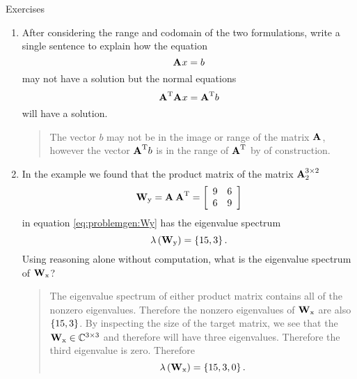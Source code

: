 \clearpage

\begin{xcb}{Exercises}
\begin{enumerate}
\item After considering the range and codomain of the two formulations, write a single sentence to explain how the equation
\begin{equation}
  \A{}x=b
\end{equation}
may not have a solution but the normal equations
\begin{equation}
  \A{T}\A{}x=\A{T}b
\end{equation}
will have a solution. 
\begin{quotation}
The vector $b$ may not be in the image or range of the matrix $\A{}$, however the vector $\A{T}b$ is in the range of $\A{T}$ by of construction.
\end{quotation}
\item In the example we found that the product matrix of the matrix $\A{\by{3}{2}}_{2}$
\begin{equation}
   \W{y}=\A{}\,\A{T} =
\mat{cc}
 {9 & 6 \\
  6 & 9} 
\end{equation}
in equation \eqref{eq:problemgen:Wy} has the eigenvalue spectrum
\begin{equation}
  \lambda\paren{\W{y}} = \lst{15,3}.
\end{equation}
Using reasoning alone without computation, what is the eigenvalue spectrum of $\W{x}$?
\begin{quotation}
  The eigenvalue spectrum of either product matrix contains all of the nonzero eigenvalues. Therefore the nonzero eigenvalues of $\W{x}$ are also $\lst{15,3}$. By inspecting the size of the target matrix, we see that the $\W{x}\in\cmplx{\bys{3}}$ and therefore will have three eigenvalues. Therefore the third eigenvalue is zero. Therefore
\begin{equation}
  \lambda\paren{\W{x}}=\lst{15,3,0}.
\end{equation}
\end{quotation}
\end{enumerate}
\end{xcb}

\endinput
